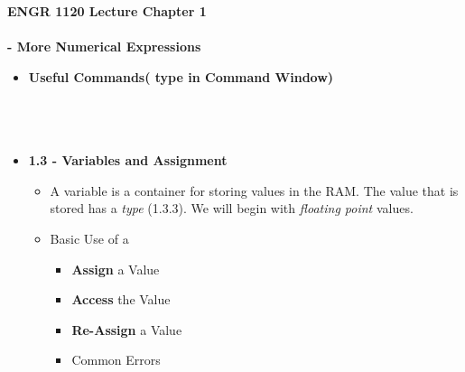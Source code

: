 \documentclass[11pt]{article}
\newcommand{\PR}{\color{mypurple}}
\newcommand{\NUM}{1 }
\begin{document}
\textbf{ \LARGE ENGR 1120 Lecture Chapter \NUM \\\\- More Numerical Expressions} \\
\Large
\begin{itemize}

	\item \textbf{ \LARGE Useful Commands( type in Command Window)}\\

		
		 \\

		
		 \\\\

	\item \textbf{ \LARGE 1.3 - Variables and Assignment} \\
		\Large
		\begin{itemize}
			\item \Large{A variable is a container for storing values in the RAM. The value that is stored has a {\it type} (1.3.3). We will begin with {\it floating point} values.} \vspace{50mm}
			
			\vspace{50mm}

		
		\newpage
			\item \LARGE{Basic Use of a \PR{\bf Variable}} \\
				\begin{itemize}
					
					\item {\bf Assign} a Value  \vspace{35mm}

					\item {\bf Access} the Value  \vspace{35mm}

					\item {\bf Re-Assign} a Value \vspace{35mm}
					
					\item Common Errors \vspace{35mm}
				

				\end{itemize}



\end{itemize}
\end{itemize}
\end{document}
